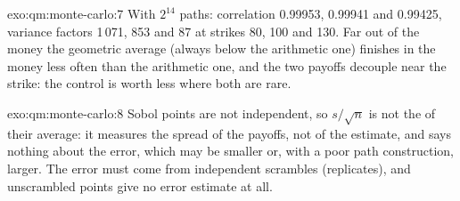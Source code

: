 \begin{solution}{exo:qm:monte-carlo:7}
With $2^{14}$ paths: correlation 0.99953, 0.99941 and 0.99425, variance factors 1\,071, 853 and 87 at strikes 80, 100 and 130. Far out of the money the geometric average (always below the
arithmetic one) finishes in the money less often than the arithmetic one, and the two payoffs decouple near the strike: the control is worth less where both are rare.
\end{solution}

\begin{solution}{exo:qm:monte-carlo:8}
Sobol points are not independent, so $s/\sqrt n$ is not the  of their average: it measures the spread of the payoffs, not of the estimate, and says nothing about the error, which
may be smaller or, with a poor path construction, larger. The error must come from independent scrambles (replicates), and unscrambled points give no error estimate at all.
\end{solution}

